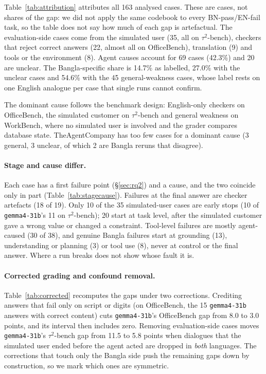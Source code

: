 \documentclass[11pt]{article}
\newcommand{\gemma}{\texttt{gemma4-31b}}
\newcommand{\OB}{OfficeBench}
\newcommand{\WB}{WorkBench}
\newcommand{\TAU}{$\tau^2$-bench}
\newcommand{\TAC}{TheAgentCompany}
\begin{document}
Table~\ref{tab:attribution} attributes all 163 analysed cases. These are cases, not shares of the
gap: we did not apply the same codebook to every BN-pass/EN-fail task, so the table does not say
how much of each gap is artefactual. The evaluation-side cases come from the simulated user
(35, all on \TAU{}), checkers that reject correct answers (22,
almost all on \OB{}), translation (9) and tools or the environment (8). Agent causes account for
69 cases (42.3\%) and 20 are unclear. The Bangla-specific share is 14.7\% as labelled, 27.0\%
with the unclear cases and 54.6\% with the 45 general-weakness cases, whose label rests on one
English analogue per case that single runs cannot confirm.

The dominant cause follows the benchmark design: English-only checkers on \OB{}, the simulated
customer on \TAU{} and general weakness on \WB{}, where no simulated user is involved and the
grader compares database state. \TAC{} has too few cases for a dominant cause (3 general, 3
unclear, of which 2 are Bangla reruns that disagree).

\paragraph{Stage and cause differ.} Each case has a first failure point (\S\ref{sec:rq2}) and a
cause, and the two coincide only in part (Table~\ref{tab:stagecause}). Failures at the final answer
are checker artefacts (18 of 19). Only 10 of the 35 simulated-user cases are early stops (10 of
\gemma{}'s 11 on \TAU{}); 20 start at task level, after the simulated customer gave a wrong value or
changed a constraint. Tool-level failures are mostly agent-caused (30 of 38), and genuine Bangla
failures start at grounding (13), understanding or planning (3) or tool use (8), never at control
or the final answer. Where a run breaks does not show whose fault it is.

\paragraph{Corrected grading and confound removal.} Table~\ref{tab:corrected} recomputes the gaps
under two corrections. Crediting answers that fail only on script or digits (on \OB{}, the 15
\gemma{} answers with correct content) cuts \gemma{}'s \OB{} gap from 8.0 to 3.0 points, and its
interval then includes zero. Removing evaluation-side cases moves \gemma{}'s \TAU{} gap from 11.5
to 5.8 points when dialogues that the simulated user ended before the agent acted are dropped in
\emph{both} languages. The corrections that touch only the Bangla side push the remaining gaps
down by construction, so we mark which ones are symmetric.
\end{document}
